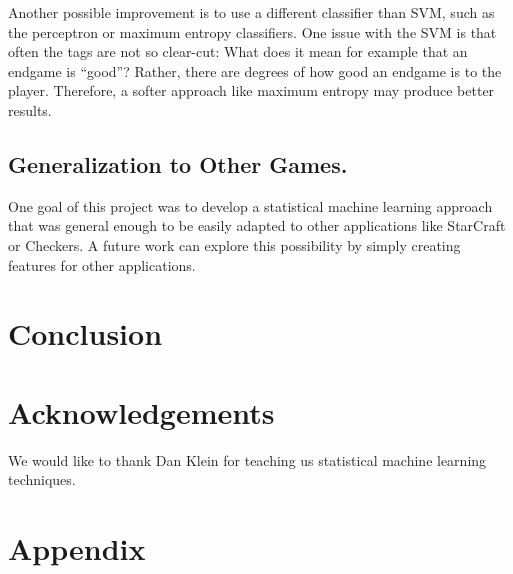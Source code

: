 \documentclass[11pt]{article}
\begin{document}
Another possible improvement is to use a different classifier than SVM, such as the perceptron or maximum entropy classifiers. One issue with the SVM is that often the tags are not so clear-cut: What does it mean for example that an endgame is “good”? Rather, there are degrees of how good an endgame is to the player. Therefore, a softer approach like maximum entropy may produce better results.

\subsection{Generalization to Other Games.}
One goal of this project was to develop a statistical machine learning approach that was general enough to be easily adapted to other applications like StarCraft or Checkers. A future work can explore this possibility by simply creating features for other applications.

\section{Conclusion}

\section{Acknowledgements}
We would like to thank Dan Klein for teaching us statistical machine learning techniques.
\section*{Appendix}
\end{document}
